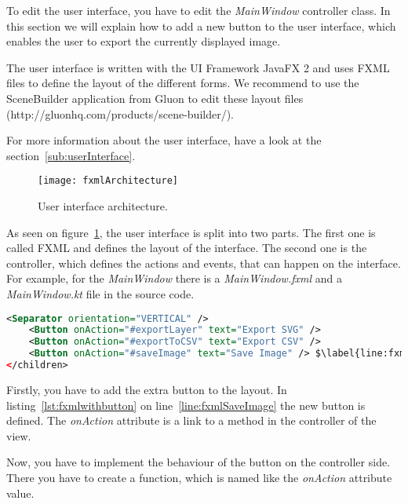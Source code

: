 To edit the user interface, you have to edit the \textit{MainWindow} controller class. In this section we will explain how to add a new button to the user interface, which enables the user to export the currently displayed image.

The user interface is written with the UI Framework JavaFX 2 and uses FXML files to define the layout of the different forms. We recommend to use the SceneBuilder application from Gluon to edit these layout files (http://gluonhq.com/products/scene-builder/).

For more information about the user interface, have a look at the section~\ref{sub:userInterface}.

\begin{figure}[H]
	\centering
	\texttt{[image: fxmlArchitecture]}
	\caption{User interface architecture.}
	\label{fig:fxmlArchitecture}
\end{figure}

As seen on figure~\ref{fig:fxmlArchitecture}, the user interface is split into two parts. The first one is called FXML and defines the layout of the interface. The second one is the controller, which defines the actions and events, that can happen on the interface. For example, for the \textit{MainWindow} there is a \textit{MainWindow.fxml} and a \textit{MainWindow.kt} file in the source code.

\begin{lstlisting}[caption={MainWindow.fxml with new button.}, label={lst:fxmlwithbutton}, language=XML, escapechar=$]
    <Separator orientation="VERTICAL" />
    <Button onAction="#exportLayer" text="Export SVG" />
    <Button onAction="#exportToCSV" text="Export CSV" />
    <Button onAction="#saveImage" text="Save Image" /> $\label{line:fxmlSaveImage}$
</children>
\end{lstlisting}

Firstly, you have to add the extra button to the layout. In listing~\ref{lst:fxmlwithbutton} on line~\ref{line:fxmlSaveImage} the new button is defined. The \textit{onAction} attribute is a link to a method in the controller of the view.

Now, you have to implement the behaviour of the button on the controller side. There you have to create a function, which is named like the \textit{onAction} attribute value.

